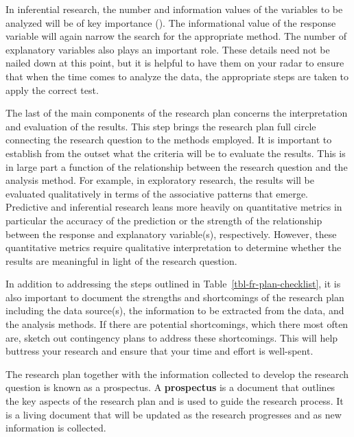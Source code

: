 \documentclass[
  letterpaper,
]{latex/krantz}
\theoremstyle{definition}
\theoremstyle{remark}
\begin{document}
In inferential research, the number and information values of the
variables to be analyzed will be of key importance
(). The informational value
of the response variable will again narrow the search for the
appropriate method. The number of explanatory variables also plays an
important role. These details need not be nailed down at this point, but
it is helpful to have them on your radar to ensure that when the time
comes to analyze the data, the appropriate steps are taken to apply the
correct test.

The last of the main components of the research plan concerns the
interpretation and evaluation of the results. This step brings the
research plan full circle connecting the research question to the
methods employed. It is important to establish from the outset what the
criteria will be to evaluate the results. This is in large part a
function of the relationship between the research question and the
analysis method. For example, in exploratory research, the results will
be evaluated qualitatively in terms of the associative patterns that
emerge. Predictive and inferential research leans more heavily on
quantitative metrics in particular the accuracy of the prediction or the
strength of the relationship between the response and explanatory
variable(s), respectively. However, these quantitative metrics require
qualitative interpretation to determine whether the results are
meaningful in light of the research question.

In addition to addressing the steps outlined in
Table~\ref{tbl-fr-plan-checklist}, it is also important to document the
strengths and shortcomings of the research plan including the data
source(s), the information to be extracted from the data, and the
analysis methods. If there are potential shortcomings, which there most
often are, sketch out contingency plans to address these shortcomings.
This will help buttress your research and ensure that your time and
effort is well-spent.

The research plan together with the information collected to develop the
research question is known as a prospectus. A \textbf{prospectus} is a
document that outlines the key aspects of the research plan and is used
to guide the research process. It is a living document that will be
updated as the research progresses and as new information is collected.
\end{document}
